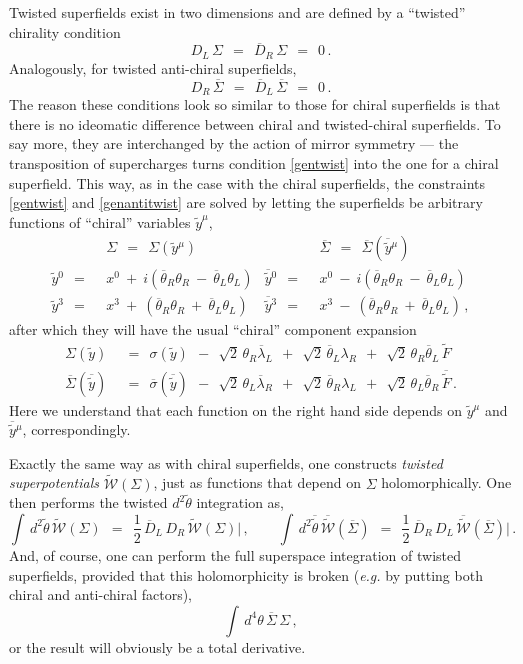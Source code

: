 \documentclass[epsfig,12pt]{article}
\def\beq{\begin{equation}}
\def\eeq{\end{equation}}
\newcommand{\cw}{{\mathcal W}}
\newcommand{\wt}{\widetilde}
\newcommand{\ov}{\overline}
\begin{document}
	Twisted superfields exist in two dimensions and are defined by a ``twisted'' chirality condition
\beq
\label{gentwist}
	D_L\, \Sigma    ~~=~~    \ov D{}_R\, \Sigma    ~~=~~    0\,.
\eeq
	Analogously, for twisted anti-chiral superfields,
\beq
\label{genantitwist}
	D_R\, \ov\Sigma    ~~=~~    \ov D{}_L\, \ov\Sigma    ~~=~~    0\,.
\eeq
	The reason these conditions look so similar to those for chiral superfields is that
	there is no ideomatic difference between chiral and twisted-chiral superfields.
	To say more, they are interchanged by the action of mirror symmetry ---
	the transposition of supercharges turns condition \eqref{gentwist} into 
	the one for a chiral superfield.
	This way, as in the case with the chiral superfields, 
	the constraints \eqref{gentwist} and \eqref{genantitwist} are solved by letting
	the superfields be arbitrary functions of ``chiral'' variables $ \wt y^\mu $,
\begin{align*}
	& \Sigma    ~~=~~    \Sigma(\wt y{}^\mu)
	&
	& \ov\Sigma    ~~=~~    \ov\Sigma(\ov{\wt y}{}^\mu)
	\\[2mm]
	\wt y{}^0    ~~=~~ &    x^0  ~+~ i \left( \ov\theta{}_R\theta_R  ~-~  \ov\theta{}_L\theta_L \right)
	&
	\ov{\wt y}{}^0     ~~=~~ &    x^0  ~-~ i \left( \ov\theta{}_R\theta_R  ~-~  \ov\theta{}_L\theta_L \right)
	\\[2mm]
	\wt y{}^3    ~~=~~ &    x^3  ~+~ \left( \ov\theta{}_R\theta_R  ~+~  \ov\theta{}_L\theta_L \right)
	&
	\ov{\wt y}{}^3    ~~=~~ &    x^3  ~-~ \left( \ov\theta{}_R\theta_R  ~+~  \ov\theta{}_L\theta_L \right)
	\,,
\end{align*}
	after which they will have the usual ``chiral'' component expansion
\begin{align*}
	\Sigma(\wt y)    & ~~=~~    \sigma(\wt y)  ~~-~~  \sqrt{2}\, \theta_R \ov\lambda{}_L
						   ~~+~~  \sqrt{2}\, \ov\theta{}_L \lambda_R
						   ~~+~~  \sqrt{2}\, \theta_R \ov\theta{}_L\, \wt{F}
	\\[2mm]
	\ov\Sigma(\ov{\wt y})    & ~~=~~    \ov\sigma(\ov{\wt y})  ~~-~~ \sqrt{2}\, \theta_L \ov\lambda{}_R
								   ~~+~~ \sqrt{2}\, \ov\theta{}_R \lambda_L
								   ~~+~~ \sqrt{2}\, \theta_L \ov\theta{}_R\, \ov{\wt F}
	\,.
\end{align*}
	Here we understand that each function on the right hand side depends on 
	$ \wt y{}^\mu $ and $ \ov{\wt y}{}^\mu $, correspondingly.

	Exactly the same way as with chiral superfields, one constructs {\it twisted superpotentials}
	$ \wt\cw(\Sigma) $, just as functions that depend on $ \Sigma $ holomorphically.
	One then performs the twisted $ d^2\tilde\theta $ integration as,
\beq
	\int\, d^2\tilde\theta\, \wt{\cw}(\Sigma)    ~~=~~    \frac{1}{2}\,\ov D{}_L\, D_R\, \wt{\cw}(\Sigma)\Big|\,,
	\qquad
	\int\, d^2\ov{\tilde\theta}\, \ov{\wt{\cw}}(\ov\Sigma)    ~~=~~    \frac{1}{2}\,\ov D{}_R\, D_L\, \ov{\wt{\cw}}(\ov\Sigma)\Big|\,.
\eeq
	And, of course, one can perform the full superspace integration of twisted superfields, provided
	that this holomorphicity is broken ({\it e.g.} by putting both chiral and anti-chiral factors),
\beq
	\int\, d^4\theta\, \ov\Sigma\, \Sigma\,,
\eeq
	or the result will obviously be a total derivative.
\end{document}
